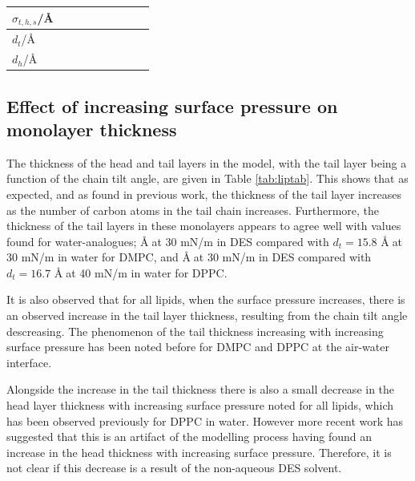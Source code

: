 \documentclass[twoside,twocolumn,9pt]{article}
\begin{document}
\begin{table}
\begin{tabular*}{\textwidth}{@{\extracolsep{\fill}}lllllllll}
		$\sigma_{t,h,s}$/\AA &  &  &  &  &  &  &  &  \\
		\hline
		$d_t$/\AA &  &  &  &  &  &  &  &  \\
		$d_h$/\AA &  &  &  &  &  &  &  &  \\
		\hline
	\end{tabular*}
\end{table}
\subsection{Effect of increasing surface pressure on monolayer thickness}
The thickness of the head and tail layers in the model, with the tail layer being a function of the chain tilt angle, are given in Table \ref{tab:liptab}. This shows that as expected, and as found in previous work,\cite{Mohwald1990,Vaknin1991} the thickness of the tail layer increases as the number of carbon atoms in the tail chain increases. Furthermore, the thickness of the tail layers in these monolayers appears to agree well with values found for water-analogues; \AA$\;$at 30 mN/m in DES compared with $d_t=15.8$ \AA$\;$at 30 mN/m\cite{Johnson1991} in water for DMPC, and \AA$\;$at 30 mN/m in DES compared with $d_t=16.7$ \AA$\;$at 40 mN/m\cite{Helm1987} in water for DPPC.

It is also observed that for all lipids, when the surface pressure increases, there is an observed increase in the tail layer thickness, resulting from the chain tilt angle descreasing. The phenomenon of the tail thickness increasing with increasing surface pressure has been noted before for DMPC\cite{Bayerl1990} and DPPC\cite{Campbell2018} at the air-water interface.

Alongside the increase in the tail thickness there is also a small decrease in the head layer thickness with increasing surface pressure noted for all lipids, which has been observed previously for DPPC in water\cite{Brumm1994}. However more recent work has suggested that this is an artifact of the modelling process\cite{Campbell2018} having found an increase in the head thickness with increasing surface pressure. Therefore, it is not clear if this decrease is a result of the non-aqueous DES solvent. 
\end{document}
